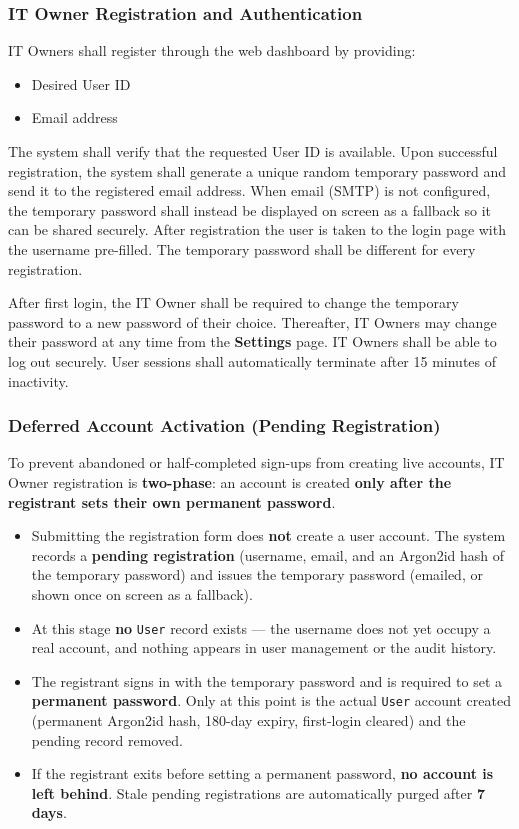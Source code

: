 \documentclass[12pt,a4paper]{article}
\begin{document}
\subsubsection{IT Owner Registration and Authentication}
IT Owners shall register through the web dashboard by providing:
\begin{itemize}
    \item Desired User ID
    \item Email address
\end{itemize}

The system shall verify that the requested User ID is available. Upon successful registration, the system shall generate a unique random temporary password and send it to the registered email address. When email (SMTP) is not configured, the temporary password shall instead be displayed on screen as a fallback so it can be shared securely. After registration the user is taken to the login page with the username pre-filled. The temporary password shall be different for every registration.

After first login, the IT Owner shall be required to change the temporary password to a new password of their choice. Thereafter, IT Owners may change their password at any time from the \textbf{Settings} page. IT Owners shall be able to log out securely. User sessions shall automatically terminate after 15 minutes of inactivity.

\subsubsection{Deferred Account Activation (Pending Registration)}
To prevent abandoned or half-completed sign-ups from creating live accounts, IT Owner
registration is \textbf{two-phase}: an account is created \textbf{only after the registrant
sets their own permanent password}.
\begin{itemize}
    \item Submitting the registration form does \textbf{not} create a user account. The
          system records a \textbf{pending registration} (username, email, and an Argon2id
          hash of the temporary password) and issues the temporary password (emailed, or
          shown once on screen as a fallback).
    \item At this stage \textbf{no} \texttt{User} record exists --- the username does not yet
          occupy a real account, and nothing appears in user management or the audit history.
    \item The registrant signs in with the temporary password and is required to set a
          \textbf{permanent password}. Only at this point is the actual \texttt{User} account
          created (permanent Argon2id hash, 180-day expiry, first-login cleared) and the
          pending record removed.
    \item If the registrant exits before setting a permanent password, \textbf{no account is
          left behind}. Stale pending registrations are automatically purged after
          \textbf{7 days}.
\end{itemize}
\end{document}
